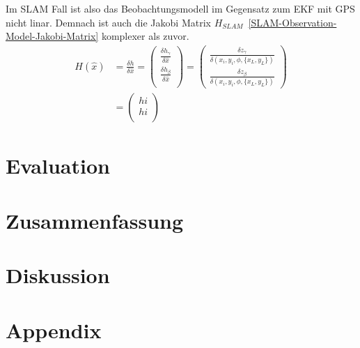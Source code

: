 \documentclass[11pt]{article}
\begin{document}
Im SLAM Fall ist also das Beobachtungsmodell im Gegensatz zum EKF mit GPS nicht linar. Demnach ist auch die Jakobi Matrix $H_{SLAM}$~\ref{SLAM-Observation-Model-Jakobi-Matrix} komplexer als zuvor.
\begin{equation}\label{SLAM-Observation-Model-Jakobi-Matrix}
\begin{split}
	H(\hat{x}) &= \frac{\delta h}{\delta \hat{x}} = \begin{pmatrix}
		\frac{\delta h_\gamma}{\delta \hat{x}} \\
		\frac{\delta h_\beta}{\delta \hat{x}} \\
	\end{pmatrix} = \begin{pmatrix}
		\frac{\delta z_\gamma}{\delta (x_i, y_i, \phi, \{x_L, y_L\})} \\
		\frac{\delta z_\beta}{\delta (x_i, y_i, \phi, \{x_L, y_L\})}
	\end{pmatrix} \\
	&= \begin{pmatrix}
		hi \\
		hi \\
	\end{pmatrix}
\end{split}
\end{equation}

\section{Evaluation}

\section{Zusammenfassung}\label{Zusammenfassung}

\section{Diskussion}\label{Diskussion}

\section{Appendix}\label{Appendix}




\end{document}
